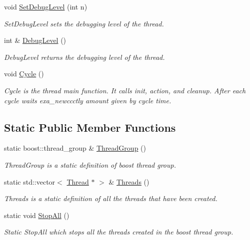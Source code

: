 \begin{DoxyCompactItemize}
void \hyperlink{classRCS_1_1Thread_a4bb0d136529374782030bf1bd19cad6d}{Set\-Debug\-Level} (int n)
\begin{DoxyCompactList}\small\item\em Set\-Debug\-Level sets the debugging level of the thread. \end{DoxyCompactList}\item 
int \& \hyperlink{classRCS_1_1Thread_abe304b8316eb45e0b01c1104376fbc41}{Debug\-Level} ()
\begin{DoxyCompactList}\small\item\em Debug\-Level returns the debugging level of the thread. \end{DoxyCompactList}\item 
void \hyperlink{classRCS_1_1Thread_a12ff1372b891db600b094d628e606045}{Cycle} ()
\begin{DoxyCompactList}\small\item\em Cycle is the thread main function. It calls init, action, and cleanup. After each cycle waits exa\-\_\-newccctly amount given by cycle time. \end{DoxyCompactList}\end{DoxyCompactItemize}
\subsection*{Static Public Member Functions}
\begin{DoxyCompactItemize}
\item 
static boost\-::thread\-\_\-group \& \hyperlink{classRCS_1_1Thread_ae3269a75272f142bc8423ecef1d98d12}{Thread\-Group} ()
\begin{DoxyCompactList}\small\item\em Thread\-Group is a static definition of boost thread group. \end{DoxyCompactList}\item 
static std\-::vector$<$ \hyperlink{classRCS_1_1Thread}{Thread} $\ast$ $>$ \& \hyperlink{classRCS_1_1Thread_a9accd6dbb70083160c9d1aa21585b5f9}{Threads} ()
\begin{DoxyCompactList}\small\item\em Threads is a static definition of all the threads that have been created. \end{DoxyCompactList}\item 
static void \hyperlink{classRCS_1_1Thread_af87a4097886fda25c7527089548fe2c8}{Stop\-All} ()
\begin{DoxyCompactList}\small\item\em Static Stop\-All which stops all the threads created in the boost thread group. \end{DoxyCompactList}\end{DoxyCompactItemize}
